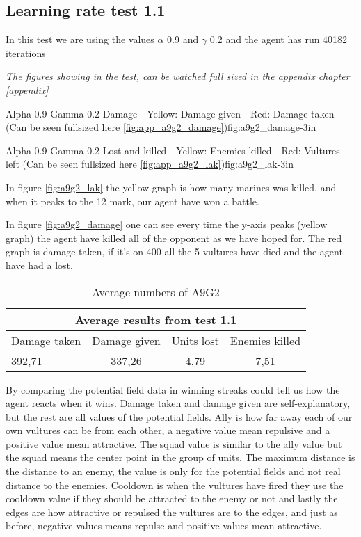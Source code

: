 \subsection*{Learning rate test 1.1}
In this test we are using the values $\alpha$ 0.9 and $\gamma$ 0.2 and the agent has run 40182 iterations


\textit{The figures showing in the test, can be watched full sized in the appendix chapter \ref{appendix}} 

			{Alpha 0.9 Gamma 0.2 Damage - Yellow: Damage given - Red: Damage taken (Can be seen fullsized here \ref{fig:app_a9g2_damage})}{fig:a9g2_damage}{-3in}

			{Alpha 0.9 Gamma 0.2 Lost and killed - Yellow: Enemies killed - Red: Vultures left (Can be seen fullsized here \ref{fig:app_a9g2_lak})}{fig:a9g2_lak}{-3in}
			
			
In figure \ref{fig:a9g2_lak} the yellow graph is how many marines was killed, and when it peaks to the 12 mark, our agent have won a battle.




In figure \ref{fig:a9g2_damage} one can see every time the y-axis peaks (yellow graph) the agent have killed all of the opponent as we have hoped for. The red graph is damage taken, if it's on 400 all the 5 vultures have died and the agent have had a lost.

\begin{centering}
\begin{table}
 \begin{tabular}{|l|c|c|c|}
	\multicolumn{4}{c}{Average results from test 1.1} \\
	\hline
		Damage taken & Damage given & Units lost & Enemies killed\\
	\hline
		392,71 & 337,26 & 4,79 & 7,51 \\
	\hline
\end{tabular}
\caption{Average numbers of A9G2}
\label{test1.1}
\end{table}
\end{centering}
\newpage
By comparing the potential field data in winning streaks could tell us how the agent reacts when it wins. Damage taken and damage given are self-explanatory, but the rest are all values of the potential fields. Ally is how far away each of our own vultures can be from each other, a negative value mean repulsive and a positive value mean attractive. The squad value is similar to the ally value but the squad means the center point in the group of units. The maximum distance is the distance to an enemy, the value is only for the potential fields and not real distance to the enemies. Cooldown is when the vultures have fired they use the cooldown value if they should be attracted to the enemy or not and lastly the edges are how attractive or repulsed the vultures are to the edges, and just as before, negative values means repulse and positive values mean attractive. 
\newpage
